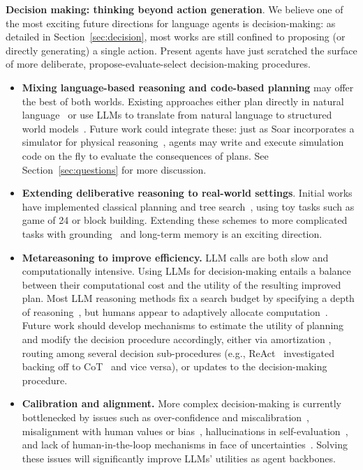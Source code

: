 \documentclass[10pt]{article} %
\begin{document}
\textbf{Decision making: thinking beyond action generation}. We believe one of the most exciting future directions for language agents is decision-making: as detailed in Section~\ref{sec:decision}, most works are still confined to proposing (or directly generating) a single action. Present agents have just scratched the surface of more deliberate, propose-evaluate-select decision-making procedures. 
\begin{itemize}
    \item \textbf{Mixing language-based reasoning and code-based planning} may offer the best of both worlds. Existing approaches either plan directly in natural language~\citep{inner2022huang, ahn2022can} or use LLMs to translate from natural language to structured world models~\citep{wong2023word, liu2023llm+, zhang2023grounded, li2023lampp, guan2023leveraging, silver2022fmdmpddl, silver2023generalized}. Future work could integrate these: just as Soar incorporates a simulator for physical reasoning~\citep{laird2022}, agents may write and execute simulation code on the fly to evaluate the consequences of plans. See Section~\ref{sec:questions} for more discussion.
    \item \textbf{Extending deliberative reasoning to real-world settings}. Initial works have implemented classical planning and tree search~\citep{yao2023tree, hao2023reasoning, liu2023llm+, dagan2023dynamic}, using toy tasks such as game of 24 or block building. Extending these schemes to more complicated tasks with grounding~\citep{qin2023toolllm} and long-term memory is an exciting direction.
    \item \textbf{Metareasoning to improve efficiency.} LLM calls are both slow and computationally intensive. Using LLMs for decision-making entails a balance between their computational cost and the utility of the resulting improved plan. Most LLM reasoning methods fix a search budget by specifying a depth of reasoning~\citep{yao2023tree}, but humans appear to adaptively allocate computation~\citep{russek2022time, lieder2020resource, callaway2022rational, gershman2015computational}. Future work should develop mechanisms to estimate the utility of planning~\citep{laidlaw2023bridging} and modify the decision procedure accordingly, either via amortization \citep[fine-tuning the LLM based on the results of previous actions, e.g.][]{nguyen2023language, hamrick2019combining}, routing among several decision sub-procedures (e.g., ReAct~\citep{yao2022react} investigated backing off to CoT~\citep{wei2022chain} and vice versa), or updates to the decision-making procedure.
    \item \textbf{Calibration and alignment.} More complex decision-making is currently bottlenecked by issues such as over-confidence and miscalibration~\citep{jiang2021can, braverman2020calibration, chen2022close}, misalignment with human values or bias~\citep{liang2021towards, feng2023pretraining}, hallucinations in self-evaluation~\citep{shinn2023reflexion}, and lack of human-in-the-loop mechanisms in face of uncertainties~\citep{nguyen2022hari, ren2023robots}. Solving these issues will significantly improve LLMs' utilities as agent backbones.
\end{itemize}
\end{document}
